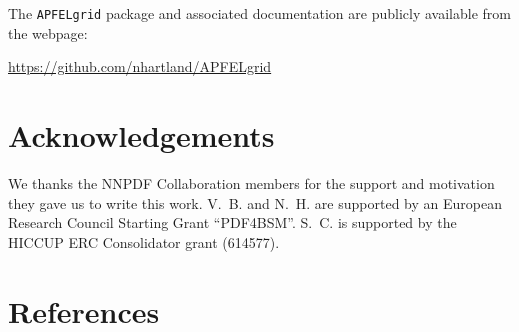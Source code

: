 \documentclass[preprint,12pt]{elsarticle}
\begin{document}
The {\tt APFELgrid} package and associated documentation are publicly available from the webpage:
\begin{center}
\url{https://github.com/nhartland/APFELgrid}
\end{center}

\section*{Acknowledgements}

We thanks the NNPDF Collaboration members for the support and
motivation they gave us to write this work. V.~B. and N.~H. are
supported by an European Research Council Starting Grant ``PDF4BSM''.
S.~C. is supported by the HICCUP ERC Consolidator grant (614577).





\section*{References}








\end{document}
